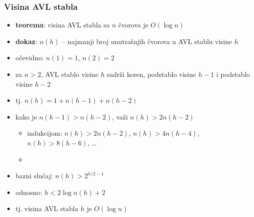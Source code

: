 \documentclass[compress,aspectratio=169]{beamer}
\begin{document}
\begin{frame}[fragile]
  \frametitle{Visina AVL stabla}
  \begin{itemize}
    \item \textbf{teorema}: visina AVL stabla sa $n$ čvorova je $O(\log n)$
    \item \textbf{dokaz}: $n(h)$ -- najmanji broj unutrašnjih čvorova u AVL stablu visine $h$
    \item očevidno: $n(1)=1$, $n(2)=2$
    \item za $n>2$, AVL stablo visine $h$ sadrži koren, podstablo visine $h-1$ i podstablo visine $h-2$
    \item tj. $n(h) = 1 + n(h-1) + n(h-2)$
    \item kako je $n(h-1)>n(h-2)$, važi $n(h)>2n(h-2)$
    \begin{itemize}
      \item indukcijom: $n(h)>2n(h-2)$, $n(h)>4n(h-4)$, $n(h)>8(h-6)$, \ldots
      \item {}
    \end{itemize}
    \item bazni slučaj: $n(h)>2^{h/2-1}$
    \item odnosno: $h < 2\log n(h) + 2$
    \item tj. visina AVL stabla $h$ je $O(\log n)$
  \end{itemize}
\end{frame}
\end{document}
